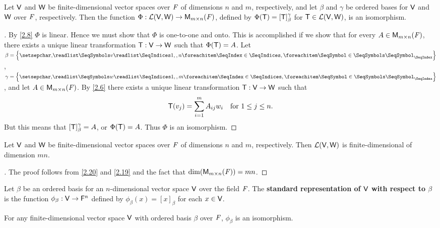 \begin{thm}\label{2.20}
	Let \(\mathsf{V}\) and \(\mathsf{W}\) be finite-dimensional vector spaces over \(\mathit{F}\) of dimensions \(n\) and \(m\), respectively, and let \(\beta\) and \(\gamma\) be ordered bases for \(\mathsf{V}\) and \(\mathsf{W}\) over \(\mathit{F}\), respectively.
	Then the function \(\Phi : \ls(\V, \W) \to \ms\), defined by \(\Phi(\mathsf{T}) = [\mathsf{T}]_{\beta}^{\gamma}\) for \(\mathsf{T} \in \mathcal{L}(\mathsf{V}, \mathsf{W})\), is an isomorphism.
\end{thm}

\begin{proof}[]
	By \cref{2.8} \(\Phi\) is linear.
	Hence we must show that \(\Phi\) is one-to-one and onto.
	This is accomplished if we show that for every \(A \in \ms\), there exists a unique linear transformation \(\mathsf{T} : \mathsf{V} \to \mathsf{W}\) such that \(\Phi(\mathsf{T}) = A\).
	Let \(\beta = \set{\seq{v}{1,,n}}\), \(\gamma = \set{\seq{w}{1,,m}}\), and let \(A \in \ms\).
	By \cref{2.6} there exists a unique linear transformation \(\mathsf{T} : \mathsf{V} \to \mathsf{W}\) such that
	\[
		\mathsf{T}(v_j) = \sum_{i = 1}^m A_{i j} w_i \quad \text{for } 1 \leq j \leq n.
	\]
	But this means that \([\mathsf{T}]_{\beta}^{\gamma} = A\), or \(\Phi(\mathsf{T}) = A\).
	Thus \(\Phi\) is an isomorphism.
\end{proof}

\begin{cor}\label{2.4.10}
	Let \(\mathsf{V}\) and \(\mathsf{W}\) be finite-dimensional vector spaces over \(\mathit{F}\) of dimensions \(n\) and \(m\), respectively.
	Then \(\mathcal{L}(\mathsf{V}, \mathsf{W})\) is finite-dimensional of dimension \(mn\).
\end{cor}

\begin{proof}[]
	The proof follows from \cref{2.20} and \cref{2.19} and the fact that \(\dim(\ms) = mn\).
\end{proof}

\begin{defn}\label{2.4.11}
	Let \(\beta\) be an ordered basis for an \(n\)-dimensional vector space \(\mathsf{V}\) over the field \(\mathit{F}\).
	The \textbf{standard representation of \(\mathsf{V}\) with respect to \(\beta\)} is the function \(\phi_{\beta} : \mathsf{V} \to \mathsf{F}^n\) defined by \(\phi_{\beta}(x) = [x]_{\beta}\) for each \(x \in \mathsf{V}\).
\end{defn}

\begin{thm}\label{2.21}
	For any finite-dimensional vector space \(\mathsf{V}\) with ordered basis \(\beta\) over \(\mathit{F}\), \(\phi_{\beta}\) is an isomorphism.
\end{thm}

